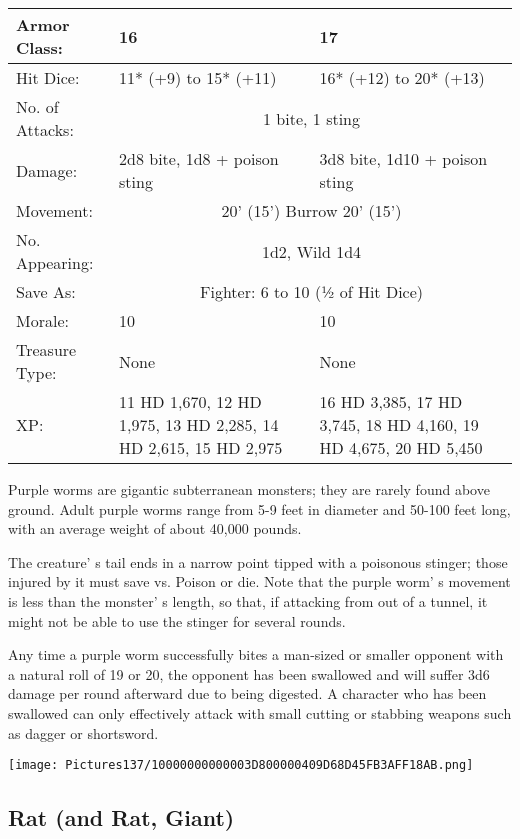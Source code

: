 \documentclass[a4paper,twoside,openany,10pt]{book}
\begin{document}
\begin{multicols}{2}
\begin{tabularx}{0.50\textwidth}{@{}lXX@{}}
Armor Class: & 16 & 17 \\\hline
Hit Dice: & 11* (+9) to 15* (+11) & 16* (+12) to 20* (+13) \\\hline
No. of Attacks: & \multicolumn{2}{c}{1 bite, 1 sting} \\\hline
Damage: & 2d8 bite, 1d8 + poison sting & 3d8 bite, 1d10 + poison sting \\\hline
Movement: & \multicolumn{2}{c}{20' (15') Burrow 20' (15')}\\\hline
No. Appearing: &  \multicolumn{2}{c}{1d2, Wild 1d4}\\\hline
Save As: & \multicolumn{2}{c}{Fighter: 6 to 10 (½ of Hit Dice)} \\\hline
Morale: & 10 & 10 \\\hline
Treasure Type: & None & None \\\hline
XP: & 11 HD 1,670, 12 HD 1,975, 13 HD 2,285, 14 HD 2,615, 15 HD 2,975 & 16 HD 3,385, 17 HD 3,745, 18 HD 4,160, 19 HD 4,675, 20 HD 5,450  \\\hline
\end{tabularx}\medskip

Purple worms are gigantic subterranean monsters; they are rarely found above ground. Adult purple worms range from 5-9 feet in diameter and 50-100 feet long, with an average weight of about 40,000 pounds. 

The creature' s tail ends in a narrow point tipped with a poisonous stinger; those injured by it must save vs. Poison or die. Note that the purple worm' s movement is less than the monster' s length, so that, if attacking from out of a tunnel, it might not be able to use the stinger for several rounds.

Any time a purple worm successfully bites a man-sized or smaller opponent with a natural roll of 19 or 20, the opponent has been swallowed and will suffer 3d6 damage per round afterward due to being digested. A character who has been swallowed can only effectively attack with small cutting or stabbing weapons such as dagger or shortsword.

\begin{center} \texttt{[image: Pictures137/10000000000003D800000409D68D45FB3AFF18AB.png]} \end{center}


\subsection*{Rat (and Rat, Giant)}\label{rat-and-rat-giant}


\end{multicols}
\end{document}
